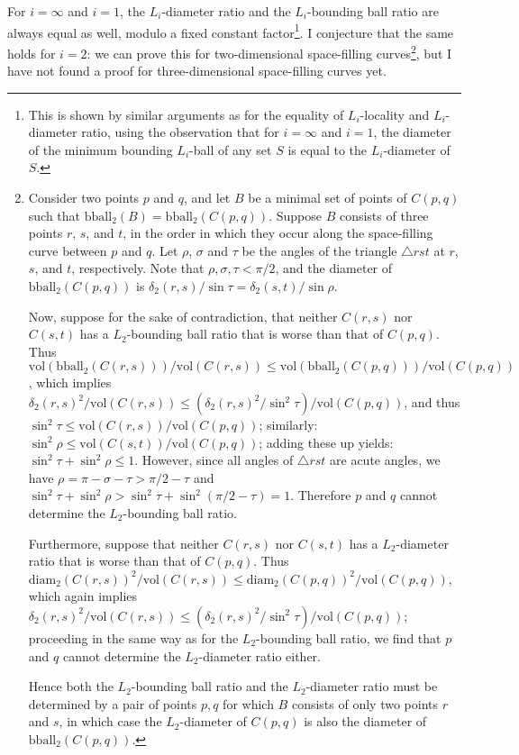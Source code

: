 \documentclass[11pt,a4paper]{article}
\begin{document}
For $i = \infty$ and $i = 1$, the $L_i$-diameter ratio and the $L_i$-bounding ball ratio are always equal as well, modulo a fixed constant factor\footnote
{This is shown by similar arguments as for the equality of $L_i$-locality and $L_i$-diameter ratio, using the observation that for $i = \infty$ and $i = 1$, the diameter of the minimum bounding $L_i$-ball of any set $S$ is equal to the $L_i$-diameter of $S$.}.
I conjecture that the same holds for $i = 2$: we can prove this for two-dimensional space-filling curves\footnote
{Consider two points $p$ and $q$, and let $B$ be a minimal set of points of $C(p,q)$ such that $\mathrm{bball}_2(B) = \mathrm{bball}_2(C(p,q))$. Suppose $B$ consists of three points $r$, $s$, and $t$, in the order in which they occur along the space-filling curve between $p$ and $q$. Let $\rho$, $\sigma$ and $\tau$ be the angles of the triangle $\triangle rst$ at $r$, $s$, and $t$, respectively. Note that $\rho, \sigma, \tau < \pi/2$, and the diameter of $\mathrm{bball}_2(C(p,q))$ is $\delta_2(r,s)/\sin\tau = \delta_2(s,t)/\sin\rho$.

Now, suppose for the sake of contradiction, that neither $C(r,s)$ nor $C(s,t)$ has a $L_2$-bounding ball ratio that is worse than that of $C(p,q)$. Thus
$\mathrm{vol}(\mathrm{bball}_2(C(r,s)))/\mathrm{vol}(C(r,s)) \leq \mathrm{vol}(\mathrm{bball}_2(C(p,q)))/\mathrm{vol}(C(p,q))$, which implies
$\delta_2(r,s)^2/\mathrm{vol}(C(r,s)) \leq  (\delta_2(r,s)^2/\sin^2\tau)/\mathrm{vol}(C(p,q))$, and thus
$\sin^2\tau \leq \mathrm{vol}(C(r,s))/\mathrm{vol}(C(p,q))$; similarly:
$\sin^2\rho \leq \mathrm{vol}(C(s,t))/\mathrm{vol}(C(p,q))$; adding these up yields:
$\sin^2\tau + \sin^2\rho \leq 1$. However, since all angles of $\triangle rst$ are acute angles, we have $\rho = \pi - \sigma - \tau > \pi/2 - \tau$ and $\sin^2\tau + \sin^2\rho > \sin^2\tau + \sin^2 (\pi/2 - \tau) = 1$. Therefore $p$ and $q$ cannot determine the $L_2$-bounding ball ratio.

Furthermore, suppose that neither $C(r,s)$ nor $C(s,t)$ has a $L_2$-diameter ratio that is worse than that of $C(p,q)$. Thus
$\mathrm{diam}_2(C(r,s))^2/\mathrm{vol}(C(r,s)) \leq \mathrm{diam}_2(C(p,q))^2/\mathrm{vol}(C(p,q))$, which again implies $\delta_2(r,s)^2/\mathrm{vol}(C(r,s)) \leq  (\delta_2(r,s)^2/\sin^2\tau)/\mathrm{vol}(C(p,q))$; proceeding in the same way as for the $L_2$-bounding ball ratio, we find that $p$ and $q$ cannot determine the $L_2$-diameter ratio either.

Hence both the $L_2$-bounding ball ratio and the $L_2$-diameter ratio must be determined by a pair of points $p,q$ for which $B$ consists of only two points $r$ and $s$, in which case the $L_2$-diameter of $C(p,q)$ is also the diameter of $\mathrm{bball}_2(C(p,q))$.},
but I have not found a proof for three-dimensional space-filling curves yet.
\end{document}
